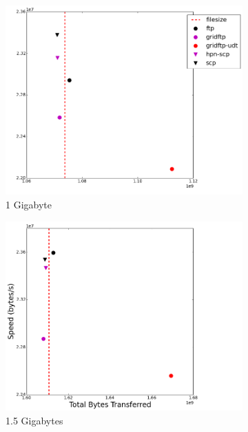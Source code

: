 \documentclass{sig-alternate-05-2015}
\begin{document}
\begin{figure}
\begin{subfigure}{.3\linewidth}
	\includegraphics[width=\linewidth]{img/speed_bytes/1G.png}
	\caption{1 Gigabyte}
	\label{speed_bytes_1G}
	\end{subfigure}
	\begin{subfigure}{.3\linewidth}
	\includegraphics[width=\linewidth]{img/speed_bytes/1_5G.png}
	\caption{1.5 Gigabytes}
	\label{speed_bytes_1_5G}
	\end{subfigure}
	\begin{subfigure}{.3\linewidth}

\end{subfigure}
\end{figure}
\end{document}
